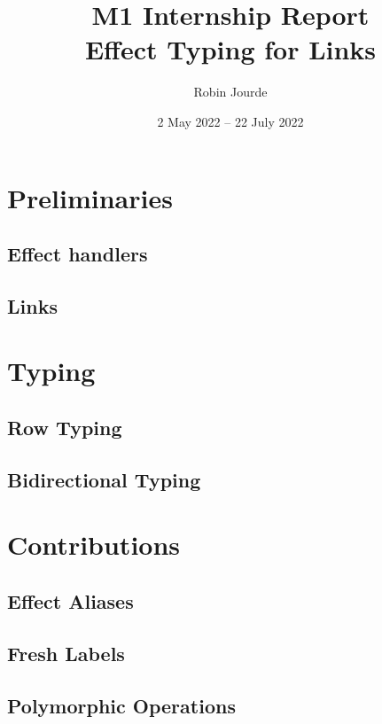 \documentclass{amsart}
\author[R. Jourde]{Robin Jourde}
\title[M1 Intership Report]{M1 Internship Report\\ Effect Typing for Links}
\date{2 May 2022 -- 22 July 2022}
\begin{document}
\maketitle


\begin{abstract}

\end{abstract}


\tableofcontents


\section{Preliminaries}

\subsection{Effect handlers}


\subsection{Links}



\section{Typing}

\subsection{Row Typing}


\subsection{Bidirectional Typing}



\section{Contributions}

\subsection{Effect Aliases}

\subsection{Fresh Labels}

\subsection{Polymorphic Operations}




\appendix




\end{document}
